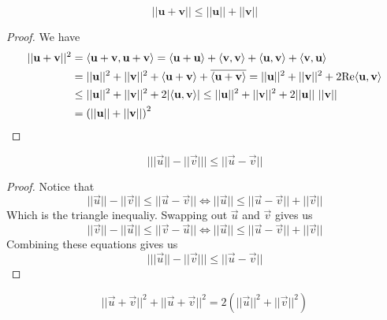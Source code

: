 \begin{theorem}
\[ ||\mathbf u + \mathbf v|| \leq ||\mathbf u|| + ||\mathbf v||\]
\end{theorem}
\begin{proof}
 We have 
 \begin{align*}
    ||\mathbf u + \mathbf v||^2 &= \langle \mathbf u + \mathbf v, \mathbf u + \mathbf v \rangle = \langle \mathbf u + \mathbf u \rangle + \langle {\mathbf v, \mathbf v} \rangle + \langle {\mathbf u, \mathbf v} \rangle + \langle {\mathbf v, \mathbf u} \rangle \\
    &= ||\mathbf u||^2 + ||\mathbf v||^2 + \langle {\mathbf u + \mathbf v} \rangle + \overline{\langle {\mathbf u + \mathbf v} \rangle} = ||\mathbf u||^2 + ||\mathbf v||^2 + 2\text{Re}\langle {\mathbf u, \mathbf v} \rangle \\
    &\leq ||\mathbf u||^2 + ||\mathbf v||^2 + 2|\langle {\mathbf u, \mathbf v} \rangle| \leq ||\mathbf u||^2 + ||\mathbf v||^2 + 2||\mathbf u||\ ||\mathbf v|| \\
    &= \left(||\mathbf u|| + ||\mathbf v||\right)^2
 \end{align*}
\end{proof}
\begin{theorem}
    \[ \big| ||\vec u|| - ||\vec v|| \big| \leq ||\vec u - \vec v||\]
\end{theorem}
\begin{proof}
    Notice that 
    \[   ||\vec u|| - ||\vec v|| \leq ||\vec u - \vec v|| \iff ||\vec u|| \leq ||\vec u - \vec v||  + ||\vec v||\]
    Which is the triangle inequaliy. Swapping out $\vec u$ and $\vec v$ gives us \[   ||\vec v|| - ||\vec u|| \leq ||\vec v - \vec u|| \iff ||\vec u|| \leq ||\vec u - \vec v||  + ||\vec v||\]
    Combining these equations gives us
    \[ \big| ||\vec u|| - ||\vec v|| \big| \leq ||\vec u - \vec v||\]
\end{proof}
\begin{fact}
\[ ||\vec u + \vec v||^2 + ||\vec u + \vec v||^2 = 2\left(||\vec u||^2 + ||\vec v||^2\right)\]
\end{fact}
